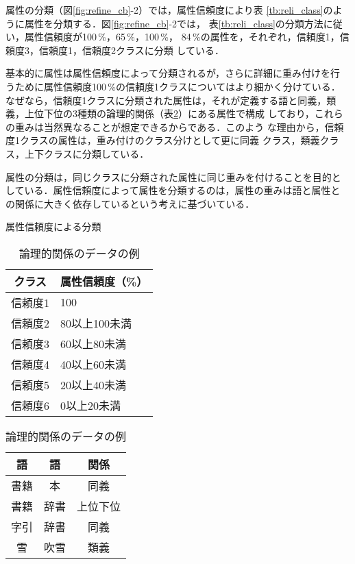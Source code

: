 属性の分類（図\ref{fig:refine_cb}-2）では，属性信頼度により表
\ref{tb:reli_class}のように属性を分類する．図\ref{fig:refine_cb}-2では，
表\ref{tb:reli_class}の分類方法に従い，属性信頼度が100\,\%，65\,\%，100\,\%，
84\,\%の属性を，それぞれ，信頼度1，信頼度3，信頼度1，信頼度2クラスに分類
している．

基本的に属性は属性信頼度によって分類されるが，さらに詳細に重み付けを行
うために属性信頼度100\,\%の信頼度1クラスについてはより細かく分けている．
なぜなら，信頼度1クラスに分類された属性は，それが定義する語と同義，類
義，上位下位の3種類の論理的関係（表\ref{tb:log_data}）にある属性で構成
しており，これらの重みは当然異なることが想定できるからである．このよう
な理由から，信頼度1クラスの属性は，重み付けのクラス分けとして更に同義
クラス，類義クラス，上下クラスに分類している．

属性の分類は，同じクラスに分類された属性に同じ重みを付けることを目的と
している．属性信頼度によって属性を分類するのは，属性の重みは語と属性と
の関係に大きく依存しているという考えに基づいている．

\begin{table}[ht]
  \begin{minipage}{.48\linewidth}
    \begin{center}
      \caption{属性信頼度による分類}
      \label{tb:reli_class}
      \begin{tabular}{cl}
        \hline
        クラス & 属性信頼度（\%） \\
        \hline
        信頼度1 & 100 \\
        信頼度2 & 80以上100未満 \\
        信頼度3 & 60以上80未満 \\
        信頼度4 & 40以上60未満 \\
        信頼度5 & 20以上40未満 \\
        信頼度6 & 0以上20未満 \\
        \hline
      \end{tabular}
    \end{center}
  \end{minipage}
  \begin{minipage}{.48\linewidth}
    \begin{center}
      \caption{論理的関係のデータの例}
      \label{tb:log_data}
      \begin{tabular}{ccc}
        \hline
        語 & 語 & 関係 \\
        \hline
        書籍 & 本 & 同義 \\
        書籍 & 辞書 & 上位下位 \\
        字引 & 辞書 & 同義 \\
        雪 & 吹雪 & 類義 \\
        \hline
      \end{tabular}
    \end{center}
  \end{minipage}
\end{table}

